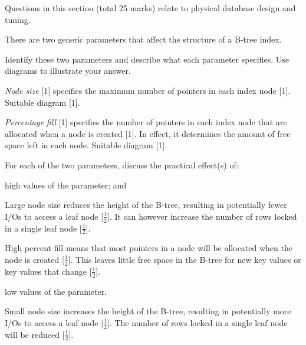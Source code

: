 \documentclass{ouexam}
\begin{document}
\begin{examsection}{25}{}{Questions in this section (total 25 marks) relate to
physical database design and tuning.}
\begin{question}{10}

\end{question}


\newpage


\begin{question}{10}
	There are two generic parameters that affect the structure of a B-tree
	index.


	\begin{subquestion}{6}
		Identify these two parameters and describe what each parameter
		specifies. Use diagrams to illustrate your answer.
		\begin{marking}
			\emph{Node size} [1] specifies the maximum number of pointers in
			each index node [1]. Suitable diagram [1].

			\emph{Percentage fill} [1] specifies the number of pointers in each
			index node that are allocated when a node is created [1]. In
			effect, it determines the amount of free space left in each node.
			Suitable diagram [1].
		\end{marking}
	\end{subquestion}
	

	\begin{subquestion}{4}
		For each of the two parameters, discuss the practical effect(s) of:
		\begin{subsubquestion}{2}
			high values of the parameter; and
			\begin{marking}
				Large node size reduces the height of the B-tree, resulting in
				potentially fewer I/Os to access a leaf node [$\frac{1}{2}$].
				It can however increase the number of rows locked in a single
				leaf node [$\frac{1}{2}$].
	
				High percent fill means that most pointers in a node will be
				allocated when the node is created [$\frac{1}{2}$]. This leaves
				little free space in the B-tree for new key values or key
				values that change [$\frac{1}{2}$].
			\end{marking}
		\end{subsubquestion}
		\begin{subsubquestion}{2}
			low values of the parameter.
			\begin{marking}
				Small node size increases the height of the B-tree, resulting
				in potentially more I/Os to access a leaf node [$\frac{1}{2}$].
				The number of rows locked in a single leaf node will be reduced
				[$\frac{1}{2}$].
	

\end{marking}
\end{subsubquestion}
\end{subquestion}
\end{question}
\end{examsection}
\end{document}
